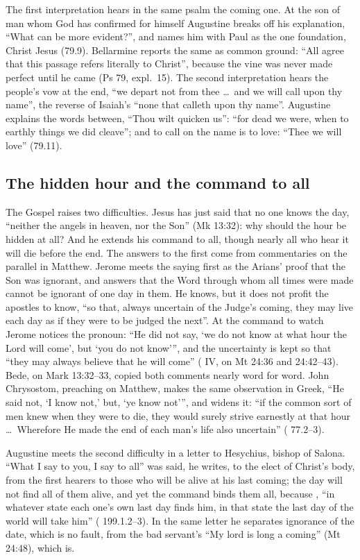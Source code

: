 The first interpretation hears in the same psalm the coming one. At the son
of man whom God has confirmed for himself Augustine breaks off his
explanation, ``What
can be more evident?'', and names him with Paul as the one foundation, Christ
Jesus (79.9). Bellarmine reports the same as common ground: ``All agree that
this passage refers literally to Christ'', because the vine was never made
perfect until he came (Ps 79, expl.~15). The second interpretation hears the
people's vow at the end, ``we depart not from thee \ldots\ and we will call
upon thy name'', the reverse of Isaiah's ``none that calleth upon thy name''.
Augustine explains the words between, ``Thou wilt quicken us'': ``for dead we
were, when to earthly things we did cleave''; and to call on the name is to
love: ``Thee we will love'' (79.11).

\subsection{The hidden hour and the command to all}

The Gospel raises two difficulties. Jesus has just said that no one knows the
day, ``neither the angels in heaven, nor the Son'' (Mk 13:32): why should the
hour be hidden at all? And he extends his command to all, though nearly all
who hear it will die before the end. The answers to the first come from
commentaries on the parallel in Matthew. Jerome meets the saying first as the
Arians' proof that the Son was ignorant, and answers that the Word through
whom all times were made cannot be ignorant of one day in them. He knows, but
it does not profit the apostles to know, ``so that, always uncertain of the
Judge's coming, they may live each day as if they were to be judged the
next''. At the command to watch Jerome notices the pronoun: ``He did not say,
`we do not know at what hour the Lord will come', but `you do not know''', and
the uncertainty is kept so that ``they may always believe that he will come''
( IV, on Mt 24:36 and 24:42--43). Bede, on
Mark 13:32--33, copied both comments nearly word for word. John Chrysostom,
preaching on Matthew, makes the same observation in Greek, ``He said not, `I
know not,' but, `ye know not''', and widens it: ``if the common sort of men
knew when they were to die, they would surely strive earnestly at that hour
\ldots\ Wherefore He made the end of each man's life also uncertain''
( 77.2--3).

Augustine meets the second difficulty in a letter to Hesychius, bishop of
Salona. ``What I say to you, I say to all'' was said, he writes, to the elect
of Christ's body, from the first hearers to those who will be alive at his
last coming; the day will not find all of them alive, and yet the command
binds them all, because , ``in whatever state each
one's own last day finds him, in that state the last day of the world will
take him'' ( 199.1.2--3). In the same letter he separates
ignorance of the date, which is no fault, from the bad servant's ``My lord is
long a coming'' (Mt 24:48), which is.

